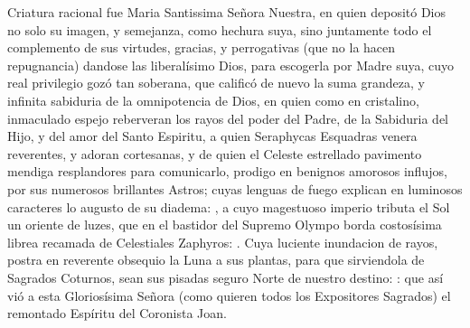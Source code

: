 Criatura racional fue Maria Santissima Señora Nuestra, en quien depositó Dios no solo su imagen, y semejanza, como hechura suya, 
sino juntamente todo el complemento de sus virtudes, gracias, y perrogativas (que no la hacen repugnancia)
dandose las liberalísimo Dios, para escogerla por Madre suya,
cuyo real privilegio gozó tan soberana, que calificó de nuevo la suma grandeza, y infinita sabiduria de la omnipotencia de Dios, 
en quien como en cristalino, inmaculado espejo reberveran los rayos del poder del Padre, de la Sabiduria del Hijo, y del amor del Santo Espiritu, 
a quien Seraphycas Esquadras venera reverentes, y adoran cortesanas, y de quien el Celeste estrellado pavimento mendiga resplandores para comunicarlo, 
prodigo en benignos amorosos influjos, por sus numerosos brillantes Astros; 
cuyas lenguas de fuego explican en luminosos caracteres lo augusto de su diadema:
, a cuyo magestuoso imperio tributa el Sol un oriente de luzes, 
que en el bastidor del Supremo Olympo borda costosísima librea recamada de Celestiales Zaphyros: .
Cuya luciente inundacion de rayos, postra en reverente obsequio la Luna a sus plantas, para que sirviendola de Sagrados Coturnos, sean sus pisadas seguro Norte de nuestro destino: 
: que así vió a esta Gloriosísima Señora (como quieren todos los Expositores Sagrados) el remontado Espíritu del Coronista Joan.

